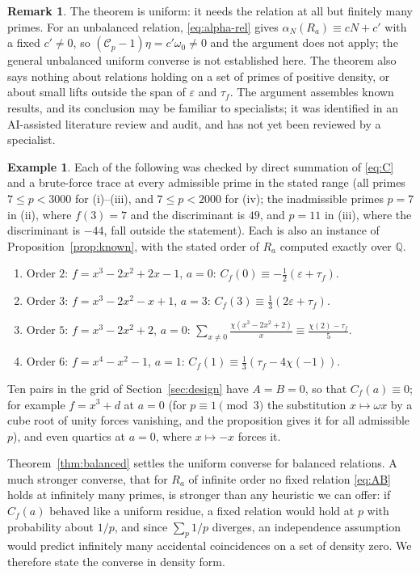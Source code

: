 \documentclass[11pt,a4paper]{article}
\numberwithin{equation}{section}
\theoremstyle{plain}
\theoremstyle{definition}
\newtheorem{example}[theorem]{Example}
\newtheorem{remark}[theorem]{Remark}
\newcommand{\Q}{\mathbb{Q}}
\newcommand{\eps}{\varepsilon}
\begin{document}
\begin{remark}\label{rem:balanced-scope}
The theorem is uniform: it needs the relation at all but finitely many primes. For an unbalanced relation, \eqref{eq:alpha-rel} gives $\alpha_N(R_a)\equiv cN+c'$ with a fixed $c'\neq0$, so $(\mathcal C_p-1)\eta=c'\omega_0\neq0$ and the argument does not apply; the general unbalanced uniform converse is not established here. The theorem also says nothing about relations holding on a set of primes of positive density, or about small lifts outside the span of $\eps$ and $\tau_f$. The argument assembles known results, and its conclusion may be familiar to specialists; it was identified in an AI-assisted literature review and audit, and has not yet been reviewed by a specialist.
\end{remark}

\begin{example}\label{ex:orders}
Each of the following was checked by direct summation of \eqref{eq:C} and a brute-force trace at every admissible prime in the stated range (all primes $7\le p<3000$ for (i)--(iii), and $7\le p<2000$ for (iv); the inadmissible primes $p=7$ in (ii), where $f(3)=7$ and the discriminant is $49$, and $p=11$ in (iii), where the discriminant is $-44$, fall outside the statement). Each is also an instance of Proposition~\ref{prop:known}, with the stated order of $R_a$ computed exactly over $\Q$.
\begin{enumerate}[label=(\roman*),leftmargin=2em,itemsep=2pt]
\item Order $2$: $f=x^3-2x^2+2x-1$, $a=0$: $C_f(0)\equiv-\tfrac12(\eps+\tau_f)$.
\item Order $3$: $f=x^3-2x^2-x+1$, $a=3$: $C_f(3)\equiv\tfrac13(2\eps+\tau_f)$.
\item Order $5$: $f=x^3-2x^2+2$, $a=0$: $\displaystyle\sum_{x\neq0}\frac{\chi(x^3-2x^2+2)}{x}\equiv\frac{\chi(2)-\tau_f}{5}$.
\item Order $6$: $f=x^4-x^2-1$, $a=1$: $C_f(1)\equiv\tfrac13(\tau_f-4\chi(-1))$.
\end{enumerate}
Ten pairs in the grid of Section~\ref{sec:design} have $A=B=0$, so that $C_f(a)\equiv0$; for example $f=x^3+d$ at $a=0$ (for $p\equiv1\pmod3$ the substitution $x\mapsto\omega x$ by a cube root of unity forces vanishing, and the proposition gives it for all admissible $p$), and even quartics at $a=0$, where $x\mapsto-x$ forces it.
\end{example}

Theorem~\ref{thm:balanced} settles the uniform converse for balanced relations. A much stronger converse, that for $R_a$ of infinite order no fixed relation \eqref{eq:AB} holds at infinitely many primes, is stronger than any heuristic we can offer: if $C_f(a)$ behaved like a uniform residue, a fixed relation would hold at $p$ with probability about $1/p$, and since $\sum_p1/p$ diverges, an independence assumption would predict infinitely many accidental coincidences on a set of density zero. We therefore state the converse in density form.
\end{document}
